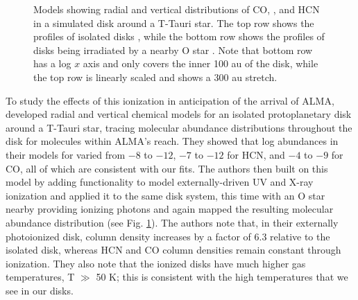 \begin{figure}[t]
  \hspace*{\fill}%
  \vfill%
  \hspace*{\fill}%
  \caption{Models showing radial and vertical distributions of CO, \hco, and HCN in a simulated disk around a T-Tauri star. The top row shows the profiles of isolated disks \citep{Walsh2010}, while the bottom row shows the profiles of disks being irradiated by a nearby O star \citep{Walsh2013}. Note that bottom row has a log $x$ axis and only covers the inner 100 au of the disk, while the top row is linearly scaled and shows a 300 au stretch.}
  \label{fig:walsh-abundance-profs}
\end{figure}




To study the effects of this ionization in anticipation of the arrival of ALMA, \citet{Walsh2010} developed radial and vertical chemical models for an isolated protoplanetary disk around a T-Tauri star, tracing molecular abundance distributions throughout the disk for molecules within ALMA's reach. They showed that log abundances in their models for \hco varied from $-8$ to $-12$, $-7$ to $-12$ for HCN, and $-4$ to $-9$ for CO, all of which are consistent with our fits. The authors then built on this model by adding functionality to model externally-driven UV and X-ray ionization \citep{Walsh2012} and applied it to the same disk system, this time with an O star nearby providing ionizing photons \citep{Walsh2013} and again mapped the resulting molecular abundance distribution (see Fig. \ref{fig:walsh-abundance-profs}). The authors note that, in their externally photoionized disk, \hco column density increases by a factor of 6.3 relative to the isolated disk, whereas HCN and CO column densities remain constant through ionization. They also note that the ionized disks have much higher gas temperatures, T $\gg$ 50 K; this is consistent with the high temperatures that we see in our disks.


